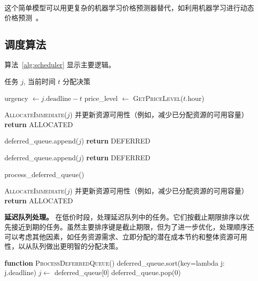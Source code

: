 \documentclass[10pt,a4paper]{article}
\begin{document}
这个简单模型可以用更复杂的机器学习价格预测器替代，如利用机器学习进行动态价格预测~\cite{dangana2025ksurf}。

\subsection{调度算法}

算法~\ref{alg:scheduler} 显示主要逻辑。

\begin{algorithm}[h]
\caption{时间套利调度器}
\label{alg:scheduler}
\begin{algorithmic}[1]
\Require 任务 $j$, 当前时间 $t$
\Ensure 分配决策

\State urgency $\gets j.\text{deadline} - t$
\State price\_level $\gets$ \textsc{GetPriceLevel}($t.\text{hour}$)

\State {}
    \State \textsc{AllocateImmediate}($j$) 并更新资源可用性（例如，减少已分配资源的可用容量）
    \State \textbf{return} ALLOCATED
\EndIf

\State {}
    \State deferred\_queue.append($j$)
    \State \textbf{return} DEFERRED
\EndIf

\State {}
\State deferred\_queue.append($j$)
    \State \textbf{return} DEFERRED
\EndIf

\State {}
    \State process\_deferred\_queue()
\EndIf

\State {}
\State \textsc{AllocateImmediate}($j$) 并更新资源可用性（例如，减少已分配资源的可用容量）
\State \textbf{return} ALLOCATED
\end{algorithmic}
\end{algorithm}

\textbf{延迟队列处理。} 在低价时段，处理延迟队列中的任务。它们按截止期限排序以优先接近到期的任务。虽然主要排序键是截止期限，但为了进一步优化，处理顺序还可以考虑其他因素，如任务资源需求、立即分配的潜在成本节约和整体资源可用性，以从队列做出更明智的分配决策。

\begin{algorithmic}[1]
\State \textbf{function} \textsc{ProcessDeferredQueue}()
\State deferred\_queue.sort(key=lambda j: j.deadline)
    \State $j \gets$ deferred\_queue[0]
        \State deferred\_queue.pop(0)
    \EndIf
\EndWhile
\end{algorithmic}
\end{document}
